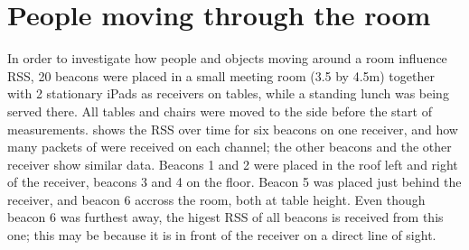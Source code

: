 \section{People moving through the room}
\label{sec:rss-busyroom}

In order to investigate how people and objects moving around a room influence RSS, 20 beacons were placed in a small meeting room (3.5 by 4.5m) together with 2 stationary iPads as receivers on tables, while a standing lunch was being served there.
All tables and chairs were moved to the side before the start of measurements.
 shows the RSS over time for six beacons on one receiver, and how many packets of were received on each channel; the other beacons and the other receiver show similar data.
Beacons 1 and 2 were placed in the roof left and right of the receiver, beacons 3 and 4 on the floor.
Beacon 5 was placed just behind the receiver, and beacon 6 accross the room, both at table height.
Even though beacon 6 was furthest away, the higest RSS of all beacons is received from this one; this may be because it is in front of the receiver on a direct line of sight.

